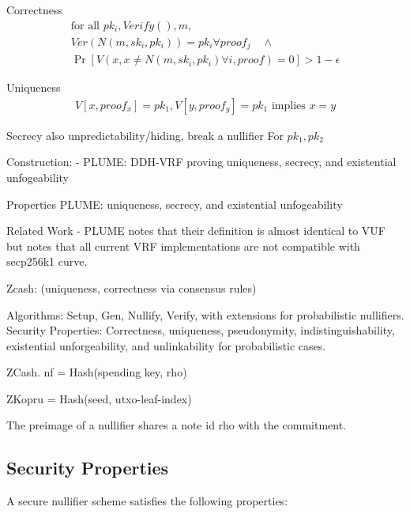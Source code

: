 Correctness
\begin{align*}
    \text{for all }pk_i, Verify(), m, \\
    Ver(N(m, sk_i, pk_i)) = pk_i \forall proof_j \quad \wedge \\
    \Pr[V(x, x\neq N(m, sk_i, pk_i) \forall i, proof) = 0] > 1-\epsilon
\end{align*}

Uniqueness
\begin{align*}
    V[x, proof_x] = pk_1, V[y, proof_y] = pk_1 \text{ implies }x = y
\end{align*}

Secrecy also unpredictability/hiding, break a nullifier
For $pk_1, pk_2$



Construction:
- PLUME: DDH-VRF proving uniqueness, secrecy, and existential unfogeability


Properties
PLUME: uniqueness, secrecy, and existential unfogeability


Related Work
- PLUME notes that their definition is almost identical to VUF but notes that all current VRF implementations are not compatible with secp256k1 curve.


Zcash: (uniqueness, correctness via consensus rules)

Algorithms: Setup, Gen, Nullify, Verify, with extensions for probabilistic nullifiers.
Security Properties: Correctness, uniqueness, pseudonymity, indistinguishability, existential unforgeability, and unlinkability for probabilistic cases.



ZCash. nf = Hash(spending key, rho)

ZKopru = Hash(seed, utxo-leaf-index)

The preimage of a nullifier shares a note id rho with the commitment.




















\subsection{Security Properties}

A secure nullifier scheme satisfies the following properties:

